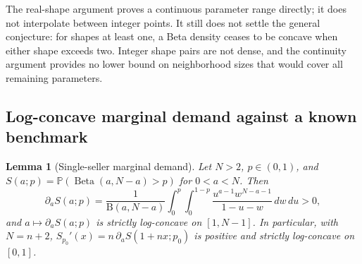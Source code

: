 \documentclass[11pt]{article}
\newcommand{\Pb}{\mathbb P}
\DeclareMathOperator{\Beta}{Beta}
\newcommand{\Bfun}{\mathrm{B}}
\newtheorem{lemma}{Lemma}
\theoremstyle{definition}
\begin{document}
The real-shape argument proves a continuous parameter range directly;
it does not interpolate between integer points. It still does not settle
the general conjecture: for shapes at least one, a Beta density ceases to
be concave when either shape exceeds two. Integer shape pairs are not
dense, and the continuity argument provides no lower bound on neighborhood
sizes that would cover all remaining parameters.

\subsection{Log-concave marginal demand against a known benchmark}

\begin{lemma}[Single-seller marginal demand]
\label{lem:single-seller-logconcave}
Let $N>2$, $p\in(0,1)$, and $S(a;p)=\Pb(\Beta(a,N-a)>p)$ for $0<a<N$. Then
\begin{equation}\label{eq:dirichlet-derivative}
\partial_aS(a;p)=\frac{1}{\Bfun(a,N-a)}
\int_0^p\int_0^{1-p}\frac{u^{a-1}w^{N-a-1}}{1-u-w}\,dw\,du>0,
\end{equation}
and $a\mapsto\partial_aS(a;p)$ is strictly log-concave on $[1,N-1]$. In
particular, with $N=n+2$, $S_{p_0}'(x)=n\,\partial_aS(1+nx;p_0)$ is positive
and strictly log-concave on $[0,1]$.
\end{lemma}
\end{document}
